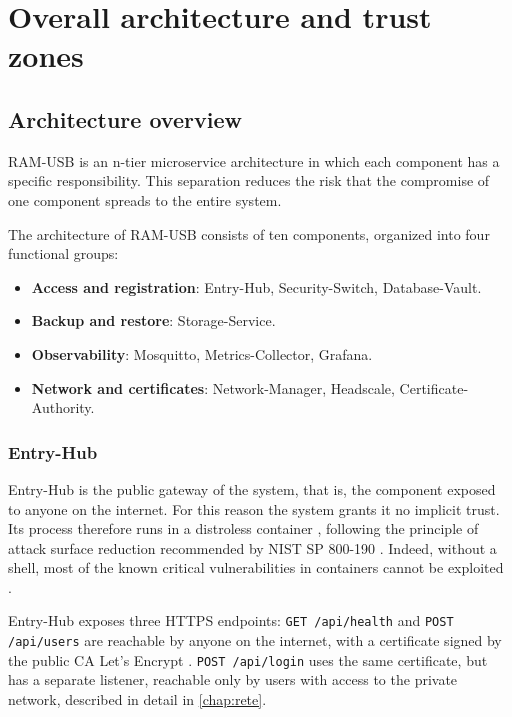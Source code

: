 \chapter{Overall architecture and trust zones}
\label{chap:architettura}

\section{Architecture overview}

RAM-USB is an n-tier microservice architecture in which each component has a specific responsibility.
This separation reduces the risk that the compromise of one component spreads to the entire system.

The architecture of RAM-USB consists of ten
components, organized into four functional groups:
\begin{itemize}
    \item \textbf{Access and registration}: Entry-Hub, Security-Switch, Database-Vault.
    \item \textbf{Backup and restore}: Storage-Service.
    \item \textbf{Observability}: Mosquitto, Metrics-Collector, Grafana.
    \item \textbf{Network and certificates}: Network-Manager, Headscale, Certificate-Authority.
\end{itemize}

\subsection{Entry-Hub}

Entry-Hub is the public gateway of the system, that is, the component exposed to anyone on the internet. For this reason
the system grants it no implicit trust. Its process therefore runs in a distroless container
\cite{distroless-github}, following the principle of attack surface reduction recommended by
NIST SP 800-190 \cite{nist-sp-800-190}.
Indeed, without a shell, most of the known critical vulnerabilities in containers cannot be exploited
\cite{wager2024distroless}.

Entry-Hub exposes three HTTPS endpoints: \texttt{GET /api/health} and \texttt{POST /api/users} are
reachable by anyone on the internet, with a certificate signed by the public CA Let's Encrypt
\cite{aas2019letsencrypt}. \texttt{POST /api/login} uses the same certificate, but has a separate listener,
reachable only by users with access to the private network, described in detail in
\autoref{chap:rete}.

